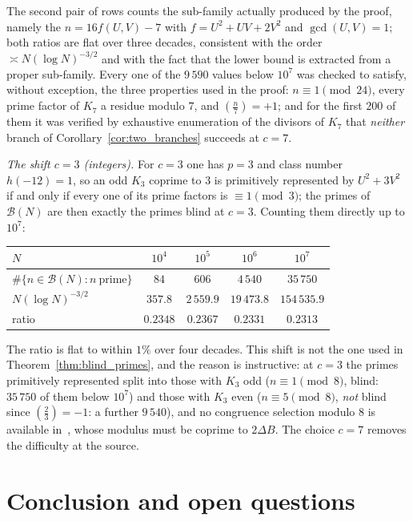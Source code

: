 \documentclass[11pt, a4paper]{article}
\theoremstyle{plain}
\theoremstyle{definition}
\newcommand{\leg}[2]{\left(\frac{#1}{#2}\right)}
\begin{document}
The second pair of rows counts the sub-family actually produced by the proof, namely the $n=16f(U,V)-7$ with $f=U^{2}+UV+2V^{2}$ and $\gcd(U,V)=1$; both ratios are flat over three decades, consistent with the order $\asymp N(\log N)^{-3/2}$ and with the fact that the lower bound is extracted from a proper sub-family. Every one of the $9\,590$ values below $10^{7}$ was checked to satisfy, without exception, the three properties used in the proof: $n\equiv1\pmod{24}$, every prime factor of $K_7$ a residue modulo $7$, and $\leg n7=+1$; and for the first $200$ of them it was verified by exhaustive enumeration of the divisors of $K_7$ that \emph{neither} branch of Corollary~\ref{cor:two_branches} succeeds at $c=7$.

\emph{The shift $c=3$ (integers).} For $c=3$ one has $p=3$ and class number $h(-12)=1$, so an odd $K_3$ coprime to $3$ is primitively represented by $U^{2}+3V^{2}$ if and only if every one of its prime factors is $\equiv1\pmod 3$; the primes of $\mathcal{B}(N)$ are then exactly the primes blind at $c=3$. Counting them directly up to $10^{7}$:

\begin{center}
\begin{tabular}{lcccc}
\toprule
$N$ & $10^{4}$ & $10^{5}$ & $10^{6}$ & $10^{7}$\\
\midrule
$\#\{n\in\mathcal{B}(N):n\ \text{prime}\}$ & $84$ & $606$ & $4\,540$ & $35\,750$\\
$N(\log N)^{-3/2}$ & $357.8$ & $2\,559.9$ & $19\,473.8$ & $154\,535.9$\\
ratio & $0.2348$ & $0.2367$ & $0.2331$ & $0.2313$\\
\bottomrule
\end{tabular}
\end{center}

The ratio is flat to within $1\%$ over four decades. This shift is not the one used in Theorem~\ref{thm:blind_primes}, and the reason is instructive: at $c=3$ the primes primitively represented split into those with $K_3$ odd ($n\equiv1\pmod 8$, blind: $35\,750$ of them below $10^{7}$) and those with $K_3$ even ($n\equiv5\pmod 8$, \emph{not} blind since $\leg23=-1$: a further $9\,540$), and no congruence selection modulo $8$ is available in~\cite[Thm.~1.1(2)]{fuchs2025}, whose modulus must be coprime to $2\Delta B$. The choice $c=7$ removes the difficulty at the source.

\section{Conclusion and open questions} \label{sec:conclusion}
\end{document}
